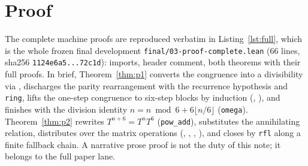 \documentclass[11pt]{article}
\begin{document}
\section{Proof}

The complete machine proofs are reproduced verbatim in
Listing~\ref{lst:full}, which is the whole frozen final development
\texttt{final/03-proof-complete.lean} (66 lines, sha256
\texttt{1124e6a5...72c1d}): imports, header comment, both theorems with their
full proofs. In brief, Theorem~\ref{thm:p1} converts the congruence into a
divisibility via , discharges the parity
rearrangement with the recurrence hypothesis and \texttt{ring}, lifts the
one-step congruence to six-step blocks by induction
(, ), and finishes with the
division identity $n = n\bmod 6 + 6\lfloor n/6\rfloor$ (\texttt{omega}).
Theorem~\ref{thm:p2} rewrites $T^{n+6}=T^n T^6$ (\texttt{pow\_add}),
substitutes the annihilating relation, distributes over the matrix operations
(, ,
, ), and closes by \texttt{rfl}
along a finite fallback chain. A narrative prose proof is not the duty of
this note; it belongs to the full paper lane.
\end{document}

